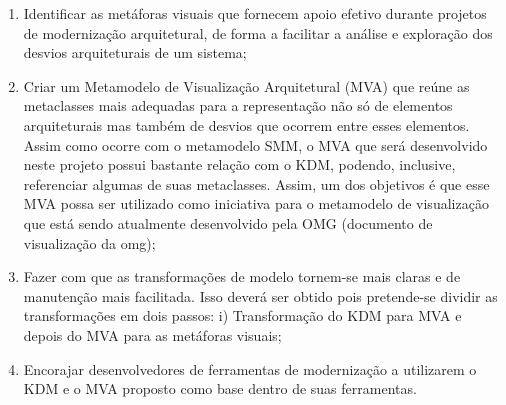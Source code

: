 \documentclass[12pt]{article}
\begin{document}
\begin{enumerate}
\item Identificar as metáforas visuais que fornecem apoio efetivo durante projetos de modernização arquitetural, de forma a facilitar a análise e exploração dos desvios arquiteturais de um sistema;

\item Criar um Metamodelo de Visualização Arquitetural (MVA) que reúne as metaclasses mais adequadas para a representação não só de elementos arquiteturais mas também de desvios que ocorrem entre esses elementos. Assim como ocorre com o metamodelo SMM, o MVA que será desenvolvido neste projeto possui bastante relação com o KDM, podendo, inclusive, referenciar algumas de suas metaclasses. Assim, um dos objetivos é que esse MVA possa ser utilizado como iniciativa para o metamodelo de visualização que está sendo atualmente desenvolvido pela OMG (documento de visualização da omg);

\item Fazer com que as transformações de modelo tornem-se mais claras e de manutenção mais facilitada. Isso deverá ser obtido pois pretende-se dividir as transformações em dois passos: i) Transformação do KDM para MVA e depois do MVA para as metáforas visuais;

\item Encorajar desenvolvedores de ferramentas de modernização a utilizarem o KDM e o MVA proposto como base dentro de suas ferramentas.

\end{enumerate}



\end{document}
